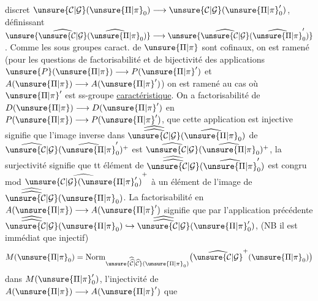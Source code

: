 discret $\unsure{\mathcal{C}|\mathcal{G}}(\unsure{\Pi|\pi}_0)\longrightarrow\unsure{\mathcal{C}|\mathcal{G}}(\unsure{\Pi|\pi}'_0)$, définissant  $\unsure{\widehat{\unsure{\mathcal{C}|\mathcal{G}}}(\widehat{\unsure{\Pi|\pi}}_0)}\longrightarrow\unsure{\widehat{\unsure{\mathcal{C}|\mathcal{G}}}(\widehat{\unsure{\Pi|\pi}}'_0)}$. Comme les sous groupes  caract. de $\unsure{\Pi|\pi}$ sont cofinaux, on est ramené (pour les questions de factorisabilité  et de bijectivité des applications $\unsure{P}(\unsure{\Pi|\pi})\longrightarrow P(\unsure{\Pi|\pi}')$ et $A(\unsure{\Pi|\pi})\longrightarrow A(\unsure{\Pi|\pi}')$) on est ramené au cas où $\unsure{\Pi|\pi}'$ est ss-groupe \uline{caractéristique}. On a    factorisabilité de $D(\unsure{\Pi|\pi})\longrightarrow D(\unsure{\Pi|\pi}')$ en $P(\unsure{\Pi|\pi})\longrightarrow P(\unsure{\Pi|\pi}')$,   que cette application est injective   
 signifie que l'image inverse dans $\widehat{\widehat{\unsure{\mathcal{C}|\mathcal{G}}}}(\widehat{\unsure{\Pi|\pi}}_0)$ de $\widehat{\unsure{\mathcal{C}|\mathcal{G}}}(\widehat{\unsure{\Pi|\pi}}'_0)^+$ est $\widehat{\unsure{\mathcal{C}|\mathcal{G}}}(\widehat{\unsure{\Pi|\pi}}_0)^+$, la surjectivité  signifie que tt élément de $\widehat{\widehat{\unsure{\mathcal{C}|\mathcal{G}}}}(\widehat{\unsure{\Pi|\pi}}'_0)$ est congru mod $\widehat{\unsure{\mathcal{C}|\mathcal{G}}(\unsure{\Pi|\pi}'_0)}^+$ à un élément de l'image de $\widehat{\widehat{\unsure{\mathcal{C}|\mathcal{G}}}}(\unsure{\Pi|\pi}_0)$. La factorisabilité en $A(\unsure{\Pi|\pi})\longrightarrow A(\unsure{\Pi|\pi}')$ signifie que par  l'application précédente  $\widehat{\widehat{\unsure{\mathcal{C}|\mathcal{G}}}}(\unsure{\Pi|\pi}_0)\hookrightarrow\widehat{\widehat{\unsure{\mathcal{C}|\mathcal{G}}}}(\unsure{\Pi|\pi}'_0)$, (NB il est immédiat que  injectif)  
\[
M(\unsure{\Pi|\pi}_0)=\operatorname{Norm}_{\unsure{\widehat{\widehat{\mathcal{C}}}|\widehat{\mathcal{C}}}(\unsure{\Pi|\pi}_0)}\bigl(\widehat{\unsure{\mathcal{C}|\mathcal{G}}}^{+}(\unsure{\Pi|\pi}_0)\bigr)
\]
dans $M(\unsure{\Pi|\pi}'_0)$, l'injectivité de $A(\unsure{\Pi|\pi})\longrightarrow A(\unsure{\Pi|\pi}')$ que


